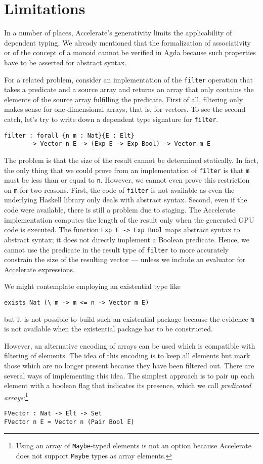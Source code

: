 \documentclass{llncs}
\begin{document}
\section{Limitations}
\label{sec:limitations}

In a number of places, Accelerate's generativity limits the
applicability of dependent typing. We already mentioned that the
formalization of associativity or of the concept of a monoid cannot be
verified in Agda because such properties have to be asserted for abstract syntax.

For a related problem, consider an implementation of the \texttt{filter}
operation that takes a predicate and a source array and returns an
array that only contains the elements of the source array fulfilling
the predicate.  First of all, filtering only makes sense for
one-dimensional arrays, that is, for vectors. To see the second catch,
let's try to write down a dependent type signature for \texttt{filter}.
\begin{verbatim}
filter : forall {n m : Nat}{E : Elt}
       -> Vector n E -> (Exp E -> Exp Bool) -> Vector m E
\end{verbatim}
The problem is that the size of the result
cannot be determined statically. In fact, the only thing that we could
prove from an implementation of \texttt{filter} is that
\texttt{m} must be less than or equal to \texttt{n}.
However, we cannot even prove this restriction on \texttt{m} for two
reasons. First, the code of \texttt{filter} is not available as even
the underlying Haskell library only deals with abstract
syntax. Second, even if the code were available, there is still a
problem due to staging. The Accelerate implementation computes the length of the result only when the generated GPU code is executed. The function \texttt{Exp E -> Exp Bool} maps abstract syntax to abstract syntax; it does not directly implement a Boolean predicate. Hence, we cannot use the predicate in the result type of \texttt{filter} to more accurately constrain the size of the resulting vector --- unless we include an evaluator for Accelerate expressions. 

We might contemplate employing an existential type like
\begin{verbatim}
exists Nat (\ m -> m <= n -> Vector m E)
\end{verbatim}
but it is not possible to build such an
existential package because the evidence \texttt{m} is not available
when the existential package has to be constructed.

However, an alternative encoding of arrays can be
used which is compatible with filtering of elements. The idea of this
encoding is to keep all elements but mark those which are no longer
present because they have been filtered out.
There are several ways of implementing this idea. The simplest
approach is to pair up each element with a boolean flag that indicates
its presence, which we call \emph{predicated arrays}:\footnote{Using an array of \texttt{Maybe}-typed elements is not an option
  because Accelerate does not support \texttt{Maybe} types as array elements.}
\begin{verbatim}
FVector : Nat -> Elt -> Set
FVector n E = Vector n (Pair Bool E)
\end{verbatim}
\end{document}
